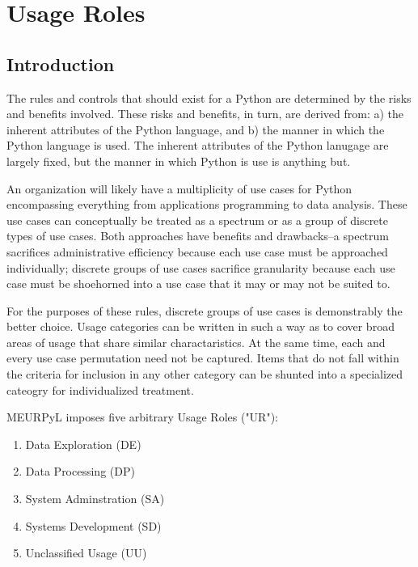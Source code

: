 \section{Usage Roles}

\thispagestyle{section_start_style}

	\subsection*{Introduction}

		The rules and controls that should exist for a Python are determined by the risks and benefits involved. These risks and benefits, in turn, are derived from: a) the inherent attributes of the Python language, and b) the manner in which the Python language is used. The inherent attributes of the Python lanugage are largely fixed, but the manner in which Python is use is anything but.

		An organization will likely have a multiplicity of use cases for Python encompassing everything from applications programming to data analysis. These use cases can conceptually be treated as a spectrum or as a group of discrete types of use cases. Both approaches have benefits and drawbacks--a spectrum sacrifices administrative efficiency because each use case must be approached individually; discrete groups of use cases sacrifice granularity because each use case must be shoehorned into a use case that it may or may not be suited to.

		For the purposes of these rules, discrete groups of use cases is demonstrably the better choice. Usage categories can be written in such a way as to cover broad areas of usage that share similar charactaristics. At the same time, each and every use case permutation need not be captured. Items that do not fall within the criteria for inclusion in any other category can be shunted into a specialized cateogry for individualized treatment.

		MEURPyL imposes five arbitrary Usage Roles ("UR"):

		\begin{enumerate}
        	\item Data Exploration (DE)
        	\item Data Processing (DP)
        	\item System Adminstration (SA)
        	\item Systems Development (SD)
        	\item Unclassified Usage (UU)
        \end{enumerate}

